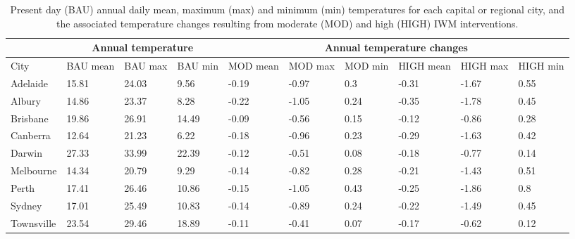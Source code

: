 \documentclass[utf8]{frontiersSCNS} %
\begin{document}
\setlength\arrayrulewidth{1pt} %
\begin{table}[!ht]\caption{Present day (BAU) annual daily mean, maximum (max) and minimum (min) temperatures for each capital or regional city, and the associated temperature changes resulting from moderate (MOD) and high (HIGH) IWM interventions.}
    \centering
    \small
    \begin{tabular}{|p{1.7cm}|p{1.0cm}|p{1.0cm}|p{1.0cm}|p{1.0cm}|p{1.0cm}|p{1.0cm}|p{1.0cm}|p{1.0cm}|p{1.0cm}|}
    \hline
        \rowcolor{dark-blue}\multicolumn{1}{c|}{} & \multicolumn{3}{c|}{Annual temperature} & \multicolumn{6}{c|}{Annual temperature changes} \\ \hline
        \rowcolor{dark-blue}City & BAU mean & BAU max & BAU   min & MOD       mean & MOD       max & MOD        min & HIGH      mean & HIGH      max & HIGH        min \\ \hline
        \rowcolor{light-gray}Adelaide & 15.81 & 24.03 & 9.56 & -0.19 & -0.97 & 0.3 & -0.31 & -1.67 & 0.55 \\ \hline
        \rowcolor{light-blue!25}Albury & 14.86 & 23.37 & 8.28 & -0.22 & -1.05 & 0.24 & -0.35 & -1.78 & 0.45 \\ \hline
        \rowcolor{light-gray}Brisbane & 19.86 & 26.91 & 14.49 & -0.09 & -0.56 & 0.15 & -0.12 & -0.86 & 0.28 \\ \hline
        \rowcolor{light-blue!25}Canberra & 12.64 & 21.23 & 6.22 & -0.18 & -0.96 & 0.23 & -0.29 & -1.63 & 0.42 \\ \hline
        \rowcolor{light-gray}Darwin & 27.33 & 33.99 & 22.39 & -0.12 & -0.51 & 0.08 & -0.18 & -0.77 & 0.14 \\ \hline
        \rowcolor{light-blue!25}Melbourne & 14.34 & 20.79 & 9.29 & -0.14 & -0.82 & 0.28 & -0.21 & -1.43 & 0.51 \\ \hline
        \rowcolor{light-gray}Perth & 17.41 & 26.46 & 10.86 & -0.15 & -1.05 & 0.43 & -0.25 & -1.86 & 0.8 \\ \hline
        \rowcolor{light-blue!25}Sydney & 17.01 & 25.49 & 10.83 & -0.14 & -0.89 & 0.24 & -0.22 & -1.49 & 0.45 \\ \hline
        \rowcolor{light-gray}Townsville & 23.54 & 29.46 & 18.89 & -0.11 & -0.41 & 0.07 & -0.17 & -0.62 & 0.12 \\ \hline
    \end{tabular}\label{table:annual}
\end{table}
\setlength\arrayrulewidth{0.4pt} %
\end{document}
